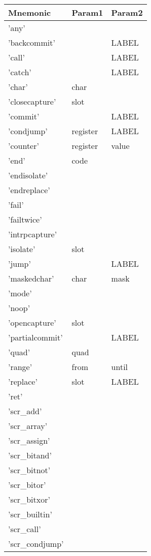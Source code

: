 
\begin{center}
\caption{Naigama Assembly Instructions}
\label{tab:naig_assembly}
\begin{longtable}{lll}
\textbf{Mnemonic} & \textbf{Param1} & \textbf{Param2} \\
\endhead
'any' &  &  \\
'backcommit' &  & LABEL \\
'call' &  & LABEL \\
'catch' &  & LABEL \\
'char' & char &  \\
'closecapture' & slot &  \\
'commit' &  & LABEL \\
'condjump' & register & LABEL \\
'counter' & register & value \\
'end' & code &  \\
'endisolate' &  &  \\
'endreplace' &  &  \\
'fail' &  &  \\
'failtwice' &  &  \\
'intrpcapture' &  &  \\
'isolate' & slot &  \\
'jump' &  & LABEL \\
'maskedchar' & char & mask \\
'mode' &  &  \\
'noop' &  &  \\
'opencapture' & slot &  \\
'partialcommit' &  & LABEL \\
'quad' & quad &  \\
'range' & from & until \\
'replace' & slot & LABEL \\
'ret' &  &  \\
'scr\_add' &  &  \\
'scr\_array' &  &  \\
'scr\_assign' &  &  \\
'scr\_bitand' &  &  \\
'scr\_bitnot' &  &  \\
'scr\_bitor' &  &  \\
'scr\_bitxor' &  &  \\
'scr\_builtin' &  &  \\
'scr\_call' &  &  \\
'scr\_condjump' &  &  \\

\end{longtable}
\end{center}
